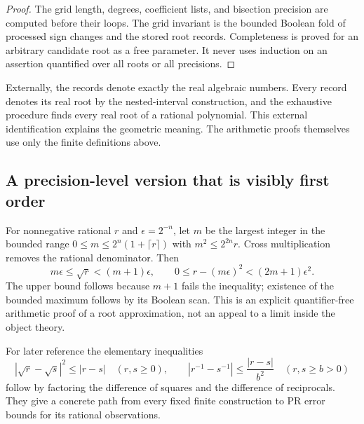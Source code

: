 \begin{proof}
The grid length, degrees, coefficient lists, and bisection precision are
computed before their loops. The grid invariant is the bounded Boolean
fold of processed sign changes and the stored root records. Completeness
is proved for an arbitrary candidate root as a free parameter. It never
uses induction on an assertion quantified over all roots or all precisions.
\end{proof}

Externally, the records denote exactly the real algebraic numbers.
Every record denotes its real root by the nested-interval construction,
and the exhaustive procedure finds every real root of a rational
polynomial. This external identification explains the geometric meaning.
The arithmetic proofs themselves use only the finite definitions above.

\subsection{A precision-level version that is visibly first order}
For nonnegative rational $r$ and $\epsilon=2^{-n}$, let $m$ be the largest
integer in the bounded range $0\le m\le 2^n(1+\lceil r\rceil)$ with
$m^2\le 2^{2n}r$. Cross multiplication removes the rational denominator.
Then
\begin{equation}\label{eq:meshroot}
 m\epsilon\le\sqrt r<(m+1)\epsilon,
 \qquad 0\le r-(m\epsilon)^2<(2m+1)\epsilon^2.
\end{equation}
The upper bound follows because $m+1$ fails the inequality; existence of
the bounded maximum follows by its Boolean scan. This is an explicit
quantifier-free arithmetic proof of a root approximation, not an appeal
to a limit inside the object theory.

For later reference the elementary inequalities
\begin{equation}\label{eq:sqrtholder}
 |\sqrt r-\sqrt s|^2\le |r-s|\quad(r,s\ge0),\qquad
 |r^{-1}-s^{-1}|\le\frac{|r-s|}{b^2}\quad(r,s\ge b>0)
\end{equation}
follow by factoring the difference of squares and the difference of
reciprocals. They give a concrete path from every fixed finite construction
to PR error bounds for its rational observations.
